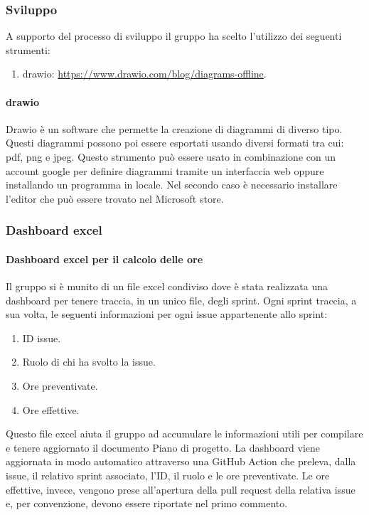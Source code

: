 \subsubsection{Sviluppo}
A supporto del processo di sviluppo il gruppo ha scelto l'utilizzo dei seguenti strumenti:
\begin{enumerate}
    \item drawio: \href{https://www.drawio.com/blog/diagrams-offline}{https://www.drawio.com/blog/diagrams-offline}.
\end{enumerate}

\paragraph{drawio}
Drawio è un software che permette la creazione di diagrammi di diverso tipo.
Questi diagrammi possono poi essere esportati usando diversi formati tra cui: pdf, png e jpeg.
Questo strumento può essere usato in combinazione con un account google per definire diagrammi tramite un interfaccia web oppure installando un programma in locale.
Nel secondo caso è necessario installare l'editor che può essere trovato nel Microsoft store. 

\subsubsection{Dashboard excel}
\paragraph{Dashboard excel per il calcolo delle ore}
Il gruppo si è munito di un file excel condiviso dove è stata realizzata una dashboard per tenere traccia, in un unico file, degli sprint. Ogni sprint traccia, a sua volta, le seguenti informazioni per ogni issue appartenente allo sprint:
\begin{enumerate}
    \item ID issue.
    \item Ruolo di chi ha svolto la issue.
    \item Ore preventivate.
    \item Ore effettive.
\end{enumerate}
Questo file excel aiuta il gruppo ad accumulare le informazioni utili per compilare e tenere aggiornato il documento Piano di progetto.
La dashboard viene aggiornata in modo automatico attraverso una GitHub Action che preleva, dalla issue, il relativo sprint associato, l’ID,
 il ruolo e le ore preventivate. Le ore effettive, invece, vengono prese all'apertura della pull request della relativa issue e, per convenzione, devono essere riportate nel primo commento.

